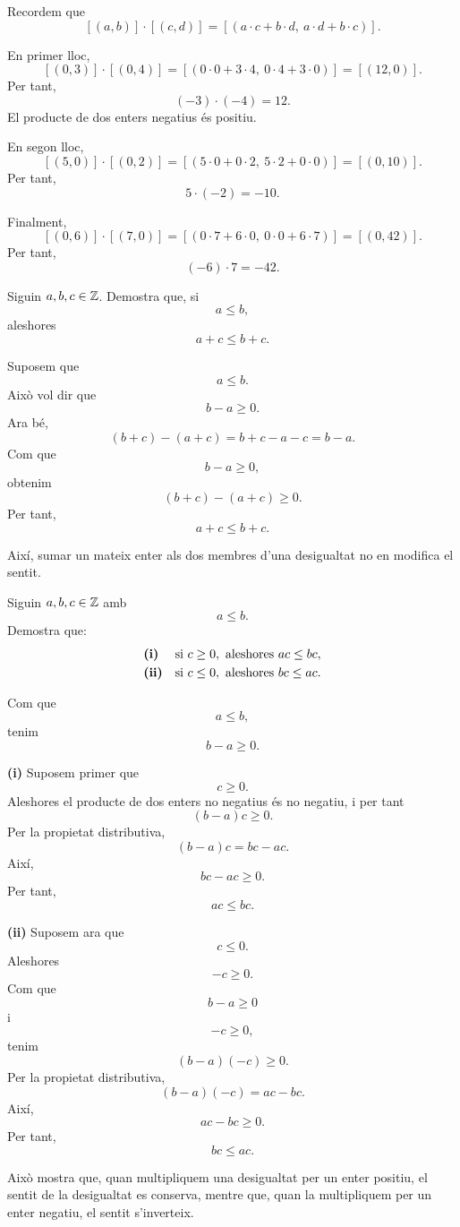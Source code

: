 \begin{solucio}
Recordem que
\[
[(a,b)]\cdot[(c,d)]
=
[(a\cdot c+b\cdot d,\ a\cdot d+b\cdot c)].
\]

En primer lloc,
\[
[(0,3)]\cdot[(0,4)]
=
[(0\cdot 0+3\cdot 4,\ 0\cdot 4+3\cdot 0)]
=
[(12,0)].
\]
Per tant,
\[
(-3)\cdot(-4)=12.
\]
El producte de dos enters negatius és positiu.

En segon lloc,
\[
[(5,0)]\cdot[(0,2)]
=
[(5\cdot 0+0\cdot 2,\ 5\cdot 2+0\cdot 0)]
=
[(0,10)].
\]
Per tant,
\[
5\cdot(-2)=-10.
\]

Finalment,
\[
[(0,6)]\cdot[(7,0)]
=
[(0\cdot 7+6\cdot 0,\ 0\cdot 0+6\cdot 7)]
=
[(0,42)].
\]
Per tant,
\[
(-6)\cdot 7=-42.
\]
\end{solucio}

\begin{exercici}
Siguin $a,b,c\in\mathbb{Z}$. Demostra que, si
\[
a\leq b,
\]
aleshores
\[
a+c\leq b+c.
\]
\end{exercici}

\begin{solucio}
Suposem que
\[
a\leq b.
\]
Això vol dir que
\[
b-a\geq 0.
\]
Ara bé,
\[
(b+c)-(a+c)=b+c-a-c=b-a.
\]
Com que
\[
b-a\geq 0,
\]
obtenim
\[
(b+c)-(a+c)\geq 0.
\]
Per tant,
\[
a+c\leq b+c.
\]

Així, sumar un mateix enter als dos membres d'una desigualtat no en modifica el sentit.
\end{solucio}


\begin{exercici}
Siguin $a,b,c\in\mathbb{Z}$ amb
\[
a\leq b.
\]
Demostra que:
\[
\begin{array}{ll}
\text{\textbf{(i)}} & \text{si } c\geq 0,\text{ aleshores } ac\leq bc,\\[1mm]
\text{\textbf{(ii)}} & \text{si } c\leq 0,\text{ aleshores } bc\leq ac.
\end{array}
\]
\end{exercici}

\begin{solucio}
Com que
\[
a\leq b,
\]
tenim
\[
b-a\geq 0.
\]

\medskip

\noindent\textbf{(i)} Suposem primer que
\[
c\geq 0.
\]
Aleshores el producte de dos enters no negatius és no negatiu, i per tant
\[
(b-a)c\geq 0.
\]
Per la propietat distributiva,
\[
(b-a)c=bc-ac.
\]
Així,
\[
bc-ac\geq 0.
\]
Per tant,
\[
ac\leq bc.
\]

\medskip

\noindent\textbf{(ii)} Suposem ara que
\[
c\leq 0.
\]
Aleshores
\[
-c\geq 0.
\]
Com que
\[
b-a\geq 0
\]
i
\[
-c\geq 0,
\]
tenim
\[
(b-a)(-c)\geq 0.
\]
Per la propietat distributiva,
\[
(b-a)(-c)=ac-bc.
\]
Així,
\[
ac-bc\geq 0.
\]
Per tant,
\[
bc\leq ac.
\]

Això mostra que, quan multipliquem una desigualtat per un enter positiu, el sentit de la desigualtat es conserva, mentre que, quan la multipliquem per un enter negatiu, el sentit s'inverteix.
\end{solucio}



